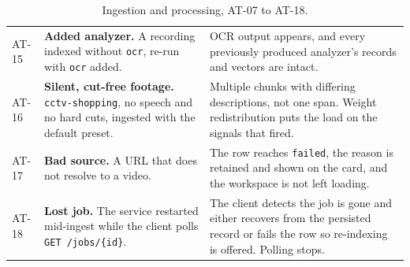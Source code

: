 \documentclass[11pt,a4paper]{article}
\begin{document}
\begin{table}[htbp]
\begin{tabularx}{\textwidth}{@{}L{0.85cm}XX@{}}
AT-15 & \textbf{Added analyzer.} A recording indexed without \texttt{ocr}, re-run with \texttt{ocr} added. & OCR output appears, and every previously produced analyzer's records and vectors are intact. \\
AT-16 & \textbf{Silent, cut-free footage.} \texttt{cctv-shopping}, no speech and no hard cuts, ingested with the default preset. & Multiple chunks with differing descriptions, not one span. Weight redistribution puts the load on the signals that fired. \\
AT-17 & \textbf{Bad source.} A URL that does not resolve to a video. & The row reaches \texttt{failed}, the reason is retained and shown on the card, and the workspace is not left loading. \\
AT-18 & \textbf{Lost job.} The service restarted mid-ingest while the client polls \texttt{GET /jobs/\{id\}}. & The client detects the job is gone and either recovers from the persisted record or fails the row so re-indexing is offered. Polling stops. \\
\bottomrule
\end{tabularx}
\caption{Ingestion and processing, AT-07 to AT-18.}
\end{table}
\end{document}
